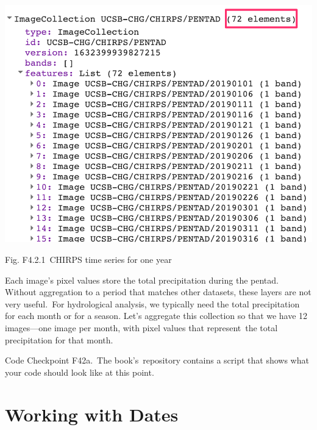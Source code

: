 \documentclass[
  letterpaper,
  DIV=11,
  numbers=noendperiod]{scrreprt}
\begin{document}
\includegraphics{./F4/image25.png}

Fig. F4.2.1~CHIRPS time series for one year

Each image's pixel values store the total precipitation during the
pentad. Without aggregation to a period that matches other datasets,
these layers are not very useful.~For hydrological analysis, we
typically need the total precipitation for each month or for a season.
Let's aggregate this collection so that we have 12 images---one image
per month, with pixel values that represent~the total precipitation for
that month.

\begin{tcolorbox}[enhanced jigsaw, left=2mm, breakable, rightrule=.15mm, opacityback=0, colframe=quarto-callout-note-color-frame, colbacktitle=quarto-callout-note-color!10!white, arc=.35mm, opacitybacktitle=0.6, toptitle=1mm, colback=white, leftrule=.75mm, title=\textcolor{quarto-callout-note-color}{\faInfo}\hspace{0.5em}{Note}, toprule=.15mm, bottomtitle=1mm, titlerule=0mm, bottomrule=.15mm, coltitle=black]

Code Checkpoint F42a.~The book's~repository contains a script that shows
what your code should look like at this point.

\end{tcolorbox}

\hypertarget{working-with-dates}{%
\section{Working with Dates}\label{working-with-dates}}
\end{document}
